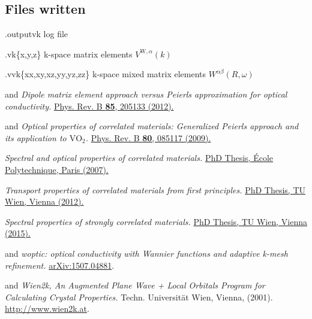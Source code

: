 \subsection{Files written}
\begin{options}
\item[\case.outputvk] log file
\item[\case.vk\{x,y,z\}] k-space matrix elements $V^{\text{W},α}(k)$
\item[\case.vvk\{xx,xy,xz,yy,yz,zz\}] k-space mixed matrix elements
  $W^{αβ}(R, ω)$ 
\end{options}


\backmatter
\begin{thebibliography}{88}
   and 
  \textit{Dipole matrix element approach versus Peierls approximation
    for optical conductivity.}
  \href{http://prb.aps.org/abstract/PRB/v85/i20/e205133}{
    Phys. Rev. B {\bf 85}, 205133 (2012).
  }

   and 
  \textit{Optical properties of correlated materials: Generalized
    Peierls approach and its application to $\text{VO}_{2}$.}
  \href{http://prb.aps.org/abstract/PRB/v80/i8/e085117}{
    Phys. Rev. B {\bf 80}, 085117 (2009).
  }

  \textit{Spectral and optical properties of correlated materials.}
  \href{https://pastel.archives-ouvertes.fr/pastel-00003163}{
    PhD Thesis, \'Ecole Polytechnique, Paris (2007).
  }

  \textit{Transport properties of correlated materials from first
    principles.}
  \href{http://katalog.ub.tuwien.ac.at/AC07812647}{
    PhD Thesis, TU Wien, Vienna (2012).
  }

  \textit{Spectral properties of strongly correlated materials.}
  \href{http://katalog.ub.tuwien.ac.at/AC12656725}{
    PhD Thesis, TU Wien, Vienna (2015).
  }

   and
  \textit{woptic: optical conductivity with Wannier functions and adaptive
    k-mesh refinement.}
  \href{http://arxiv.org/abs/1507.04881}{arXiv:1507.04881}.

   and
  \textit{Wien2k, An Augmented Plane Wave + Local Orbitals Program for
    Calculating Crystal Properties.}
  Techn. Universität Wien, Vienna, (2001).
  \url{http://www.wien2k.at}.


\end{thebibliography}
